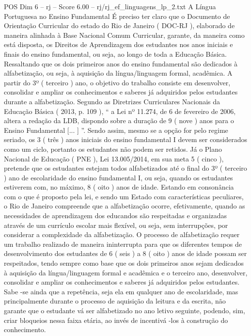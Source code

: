 \begin{textsample}{POS Dim 6 – rj – Score 6.00 – rj/rj\_ef\_linguagens\_lp\_2.txt}  \label{ex:f6_pos_277}
A Língua Portuguesa no Ensino Fundamental É preciso ter claro que o Documento de Orientação Curricular do estado do Rio de Janeiro ( DOC-RJ ), elaborado de maneira alinhada à Base Nacional Comum Curricular, garante, da maneira como está disposta, os Direitos de Aprendizagem dos estudantes nos anos iniciais e finais do ensino fundamental, ou seja, ao longo de toda a Educação Básica.
Ressaltando que os dois primeiros anos do ensino fundamental são dedicados à alfabetização, ou seja, à aquisição da língua/linguagem formal, acadêmica.
A partir do 3º ( terceiro ) ano, o objetivo do trabalho consiste em desenvolver, consolidar e ampliar os conhecimentos e saberes já adquiridos pelos estudantes durante a alfabetização.
Segundo as Diretrizes Curriculares Nacionais da Educação Básica ( 2013, p. 109 ), “ a Lei nº 11.274, de 6 de fevereiro de 2006, altera a redação da LDB, dispondo sobre a duração de 9 ( nove ) anos para o Ensino Fundamental [... ] ”.
Sendo assim, mesmo se a opção for pelo regime seriado, os 3 ( três ) anos iniciais do ensino fundamental I devem ser considerados como um ciclo, portanto os estudantes não podem ser retidos.
Já o Plano Nacional de Educação ( PNE ), Lei 13.005/2014, em sua meta 5 ( cinco ), pretende que os estudantes estejam todos alfabetizados até o final do 3º ( terceiro ) ano de escolaridade do ensino fundamental I, ou seja, quando os estudantes estiverem com, no máximo, 8 ( oito ) anos de idade.
Estando em consonância com o que é proposto pela lei, e sendo um Estado com características peculiares, o Rio de Janeiro compreende que a alfabetização ocorre, efetivamente, quando as necessidades de aprendizagem dos educandos são respeitadas e organizadas através de um currículo escolar mais flexível, ou seja, sem interrupções, por considerar a complexidade da alfabetização.
O processo de alfabetização requer um trabalho realizado de maneira ininterrupta para que os diferentes tempos de desenvolvimento dos estudantes de 6 ( seis ) a 8 ( oito ) anos de idade possam ser respeitados, tendo sempre como base que os dois primeiros anos sejam dedicados à aquisição da língua/linguagem formal e acadêmica e o terceiro ano, desenvolver, consolidar e ampliar os conhecimentos e saberes já adquiridos pelos estudantes.
Sabe -se ainda que a repetência, seja ela em qualquer ano de escolaridade, mas principalmente durante o processo de aquisição da leitura e da escrita, não garante que o estudante vá ser alfabetizado no ano letivo seguinte, podendo, sim, criar bloqueios nessa faixa etária, ao invés de incentivá -los à construção do conhecimento.

\end{textsample}
